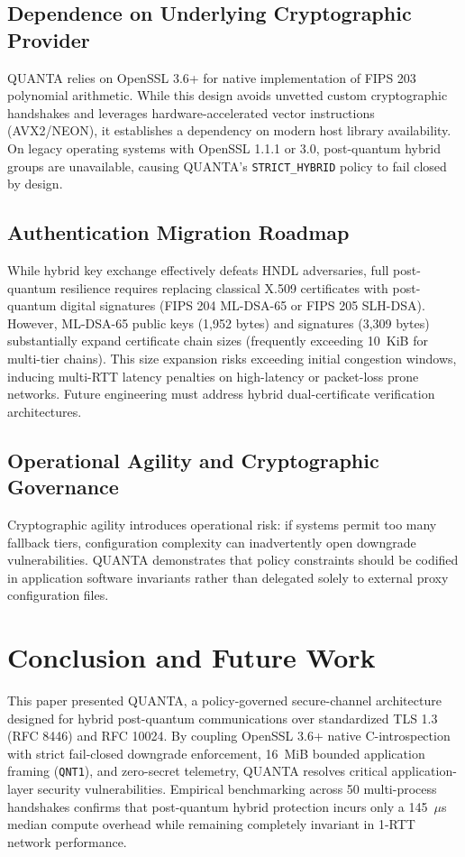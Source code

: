\documentclass[conference]{IEEEtran}
\begin{document}
\subsection{Dependence on Underlying Cryptographic Provider}
QUANTA relies on OpenSSL 3.6+ for native implementation of FIPS 203 polynomial arithmetic. While this design avoids unvetted custom cryptographic handshakes and leverages hardware-accelerated vector instructions (AVX2/NEON), it establishes a dependency on modern host library availability. On legacy operating systems with OpenSSL 1.1.1 or 3.0, post-quantum hybrid groups are unavailable, causing QUANTA's \texttt{STRICT\_HYBRID} policy to fail closed by design.

\subsection{Authentication Migration Roadmap}
While hybrid key exchange effectively defeats HNDL adversaries, full post-quantum resilience requires replacing classical X.509 certificates with post-quantum digital signatures (FIPS 204 ML-DSA-65 or FIPS 205 SLH-DSA). However, ML-DSA-65 public keys (1,952 bytes) and signatures (3,309 bytes) substantially expand certificate chain sizes (frequently exceeding 10~KiB for multi-tier chains). This size expansion risks exceeding initial congestion windows, inducing multi-RTT latency penalties on high-latency or packet-loss prone networks. Future engineering must address hybrid dual-certificate verification architectures.

\subsection{Operational Agility and Cryptographic Governance}
Cryptographic agility introduces operational risk: if systems permit too many fallback tiers, configuration complexity can inadvertently open downgrade vulnerabilities. QUANTA demonstrates that policy constraints should be codified in application software invariants rather than delegated solely to external proxy configuration files.

\section{Conclusion and Future Work}
\label{sec:future}
This paper presented QUANTA, a policy-governed secure-channel architecture designed for hybrid post-quantum communications over standardized TLS 1.3 (RFC 8446) and RFC 10024. By coupling OpenSSL 3.6+ native C-introspection with strict fail-closed downgrade enforcement, 16~MiB bounded application framing (\texttt{QNT1}), and zero-secret telemetry, QUANTA resolves critical application-layer security vulnerabilities. Empirical benchmarking across 50 multi-process handshakes confirms that post-quantum hybrid protection incurs only a 145~$\mu$s median compute overhead while remaining completely invariant in 1-RTT network performance.
\end{document}
